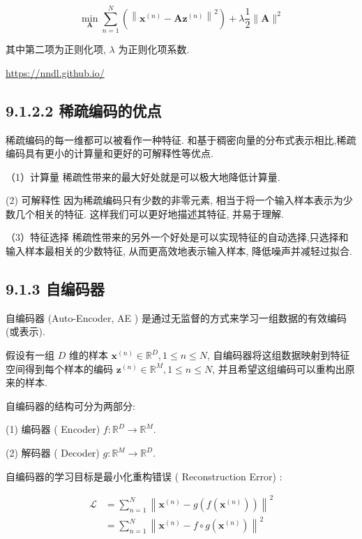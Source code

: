 \documentclass[10pt]{article}
\begin{document}
\begin{equation*}
\min _{\boldsymbol{A}} \sum_{n=1}^{N}\left(\left\|\boldsymbol{x}^{(n)}-\boldsymbol{A} \boldsymbol{z}^{(n)}\right\|^{2}\right)+\lambda \frac{1}{2}\|\boldsymbol{A}\|^{2} \tag{9.17}
\end{equation*}


其中第二项为正则化项, $\lambda$ 为正则化项系数.

\href{https://nndl.github.io/}{https://nndl.github.io/}

\subsection*{9.1.2.2 稀疏编码的优点}
稀疏编码的每一维都可以被看作一种特征. 和基于稠密向量的分布式表示相比,稀疏编码具有更小的计算量和更好的可解释性等优点.

（1）计算量 稀疏性带来的最大好处就是可以极大地降低计算量.

(2) 可解释性 因为稀疏编码只有少数的非零元素, 相当于将一个输入样本表示为少数几个相关的特征. 这样我们可以更好地描述其特征, 并易于理解.

（3）特征选择 稀疏性带来的另外一个好处是可以实现特征的自动选择,只选择和输入样本最相关的少数特征, 从而更高效地表示输入样本, 降低噪声并减轻过拟合.

\subsection*{9.1.3 自编码器}
自编码器 (Auto-Encoder, AE ) 是通过无监督的方式来学习一组数据的有效编码 (或表示).

假设有一组 $D$ 维的样本 $\boldsymbol{x}^{(n)} \in \mathbb{R}^{D}, 1 \leq n \leq N$, 自编码器将这组数据映射到特征空间得到每个样本的编码 $\boldsymbol{z}^{(n)} \in \mathbb{R}^{M}, 1 \leq n \leq N$, 并且希望这组编码可以重构出原来的样本.

自编码器的结构可分为两部分:

(1) 编码器 ( Encoder) $f: \mathbb{R}^{D} \rightarrow \mathbb{R}^{M}$.

(2) 解码器 ( Decoder) $g: \mathbb{R}^{M} \rightarrow \mathbb{R}^{D}$.

自编码器的学习目标是最小化重构错误 ( Reconstruction Error) :


\begin{align*}
\mathcal{L} & =\sum_{n=1}^{N}\left\|\boldsymbol{x}^{(n)}-g\left(f\left(\boldsymbol{x}^{(n)}\right)\right)\right\|^{2}  \tag{9.18}\\
& =\sum_{n=1}^{N}\left\|\boldsymbol{x}^{(n)}-f \circ g\left(\boldsymbol{x}^{(n)}\right)\right\|^{2} \tag{9.19}
\end{align*}
\end{document}
